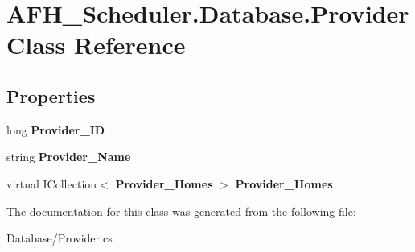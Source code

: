 \section{A\+F\+H\+\_\+\+Scheduler.\+Database.\+Provider Class Reference}
\label{class_a_f_h___scheduler_1_1_database_1_1_provider}
\subsection*{Properties}
\begin{DoxyCompactItemize}
\item 
\mbox{\label{class_a_f_h___scheduler_1_1_database_1_1_provider_a48cafcd02e6cd2bbb88ed639adb6b610}} 
long {\bfseries Provider\+\_\+\+ID}\hspace{0.3cm}{\ttfamily  [get, set]}
\item 
\mbox{\label{class_a_f_h___scheduler_1_1_database_1_1_provider_afed0a414f159b1569092f6296add8d56}} 
string {\bfseries Provider\+\_\+\+Name}\hspace{0.3cm}{\ttfamily  [get, set]}
\item 
\mbox{\label{class_a_f_h___scheduler_1_1_database_1_1_provider_ac369a8d9cc42d098a7334b14e1626c47}} 
virtual I\+Collection$<$ \textbf{ Provider\+\_\+\+Homes} $>$ {\bfseries Provider\+\_\+\+Homes}\hspace{0.3cm}{\ttfamily  [get, set]}
\end{DoxyCompactItemize}


The documentation for this class was generated from the following file\+:\begin{DoxyCompactItemize}
\item 
Database/Provider.\+cs\end{DoxyCompactItemize}
